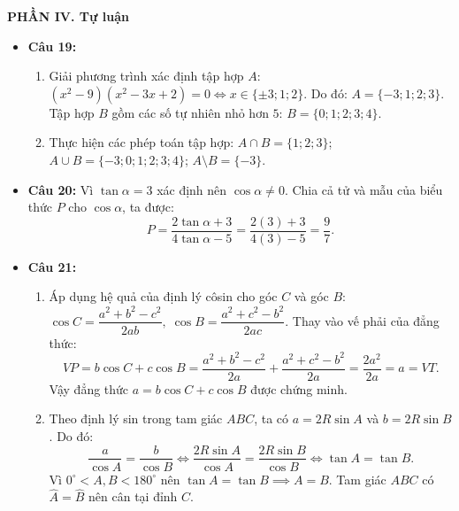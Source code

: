 \documentclass[12pt,a4paper]{article}
\begin{document}
\vspace{0.15cm}
\textbf{PHẦN IV. Tự luận}
\begin{itemize}[leftmargin=0.6cm, itemsep=2pt, topsep=1pt]
    \item \textbf{Câu 19:}
    \begin{enumerate}[label=\alph*), itemsep=1pt]
        \item Giải phương trình xác định tập hợp $A$:
        $(x^2 - 9)(x^2 - 3x + 2) = 0 \iff x \in \{\pm 3; 1; 2\}$.
        Do đó: $A = \{-3; 1; 2; 3\}$.\\
        Tập hợp $B$ gồm các số tự nhiên nhỏ hơn $5$: $B = \{0; 1; 2; 3; 4\}$.
        \item Thực hiện các phép toán tập hợp:
        $A \cap B = \{1; 2; 3\}$;\quad
        $A \cup B = \{-3; 0; 1; 2; 3; 4\}$;\quad
        $A \setminus B = \{-3\}$.
    \end{enumerate}

    \item \textbf{Câu 20:}
    Vì $\tan \alpha = 3$ xác định nên $\cos \alpha \ne 0$.
    Chia cả tử và mẫu của biểu thức $P$ cho $\cos \alpha$, ta được:
    \[
    P = \dfrac{2\tan \alpha + 3}{4\tan \alpha - 5} = \dfrac{2(3) + 3}{4(3) - 5} = \dfrac{9}{7}.
    \]

    \item \textbf{Câu 21:}
    \begin{enumerate}[label=\alph*), itemsep=1pt]
        \item Áp dụng hệ quả của định lý côsin cho góc $C$ và góc $B$:
        $\cos C = \dfrac{a^2 + b^2 - c^2}{2ab},\; \cos B = \dfrac{a^2 + c^2 - b^2}{2ac}$.
        Thay vào vế phải của đẳng thức:
        \[
        VP = b \cos C + c \cos B = \dfrac{a^2 + b^2 - c^2}{2a} + \dfrac{a^2 + c^2 - b^2}{2a} = \dfrac{2a^2}{2a} = a = VT.
        \]
        Vậy đẳng thức $a = b \cos C + c \cos B$ được chứng minh.
        \item Theo định lý sin trong tam giác $ABC$, ta có $a = 2R \sin A$ và $b = 2R \sin B$. Do đó:
        \[
        \dfrac{a}{\cos A} = \dfrac{b}{\cos B} \iff \dfrac{2R \sin A}{\cos A} = \dfrac{2R \sin B}{\cos B} \iff \tan A = \tan B.
        \]
        Vì $0^\circ < A, B < 180^\circ$ nên $\tan A = \tan B \implies A = B$.
        Tam giác $ABC$ có $\widehat{A} = \widehat{B}$ nên cân tại đỉnh $C$.
    \end{enumerate}


\end{itemize}
\end{document}
